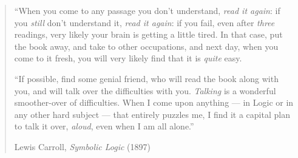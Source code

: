 \documentclass[oneside,11pt,letterpaper]{memoir}
\begin{document}
\midsloppy



\frontmatter




\newpage




\tableofcontents*

\newpage

\thispagestyle{empty}
\begin{quote}
``When you come to any passage you don't understand, \emph{read it again}: if you \emph{still} don't understand it, \emph{read it again}: if you fail, even after \emph{three} readings, very likely your brain is getting a little tired. In that case, put the book away, and take to other occupations, and next day, when you come to it fresh, you will very likely find that it is \emph{quite} easy.

``If possible, find some genial friend, who will read the book along with you, and will talk over the difficulties with you. \emph{Talking} is a wonderful smoother-over of difficulties. When I come upon anything --- in Logic or in any other hard subject --- that entirely puzzles me, I find it a capital plan to talk it over, \emph{aloud}, even when I am all alone.''

\begin{flushright} Lewis Carroll,  \emph{Symbolic Logic} (1897) \end{flushright}
\end{quote}



\mainmatter










\printindex
\end{document}
